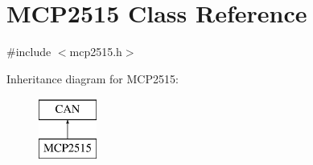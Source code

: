 \hypertarget{class_m_c_p2515}{\section{M\-C\-P2515 Class Reference}
\label{class_m_c_p2515}
}


{\ttfamily \#include $<$mcp2515.\-h$>$}

Inheritance diagram for M\-C\-P2515\-:\begin{figure}[H]
\begin{center}
\leavevmode
\includegraphics[height=2.000000cm]{class_m_c_p2515}
\end{center}
\end{figure}
